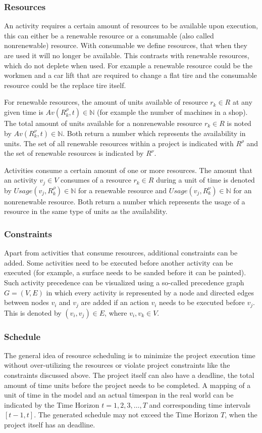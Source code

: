 \documentclass{article}
\newcommand{\renres}[0]{R^\rho} %
\newcommand{\conres}[0]{R^\nu} %
\newcommand{\av}[1]{\textit{Av}(#1)} %
\newcommand{\usage}[1]{\textit{Usage}(#1)} %
\begin{document}
\subsubsection{Resources}
An activity requires a certain amount of resources to be available upon execution, this can either be a renewable resource or a consumable (also called nonrenewable) resource.
With consumable we define resources, that when they are used it will no longer be available.
This contrasts with renewable resources, which do not deplete when used.
For example a renewable resource could be the workmen and a car lift that are required to change a flat tire and the consumable resource could be the replace tire itself.

For renewable resources, the amount of units available of resource $r_k \in R$ at any given time is $\av{\renres_k, t} \in \mathbb{N}$ (for example the number of machines in a shop).
The total amount of units available for a nonrenewable resource $r_k \in R$ is noted by $\av{\conres_k, t} \in \mathbb{N}$.
Both return a number which represents the availability in units.
The set of all renewable resources within a project is indicated with $\renres$ and the set of renewable resources is indicated by $\conres$. 

Activities consume a certain amount of one or more resources.
The amount that an activity $v_j \in V$ consumes of a resource $r_k \in R$ during a unit of time is denoted by $\usage{v_j, \renres_k} \in \mathbb{N}$ for a renewable resource and   $\usage{v_j, \conres_k} \in \mathbb{N}$ for an nonrenewable resource.
Both return a number which represents the usage of a resource in the same type of units as the availability.


\subsubsection{Constraints}
Apart from activities that consume resources, additional constraints can be added.
Some activities need to be executed before another activity can be executed (for example, a surface needs to be sanded before it can be painted).
Such activity precedence can be visualized using a so-called precedence graph $G = (V, E)$ in which every activity is represented by a node and directed edges between nodes $v_i$ and $v_j$ are added if an action $v_i$ needs to be executed before $v_j$.
This is denoted by $(v_i,v_j) \in E$, where $v_i, v_k \in V$.

\subsubsection{Schedule}
The general idea of resource scheduling is to minimize the project execution time without over-utilizing the resources or violate project constraints like the constraints discussed above.
The project itself can also have a deadline, the total amount of time units before the project needs to be completed.
A mapping of a unit of time in the model and an actual timespan in the real world can be indicated by the Time Horizon $t=1,2,3,\ldots,T$ and corresponding time intervals $[t-1,t]$.
The generated schedule may not exceed the Time Horizon $T$, when the project itself has an deadline.
\end{document}
